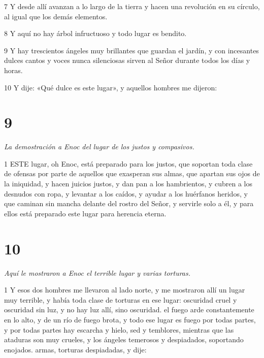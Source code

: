 \par 7 Y desde allí avanzan a lo largo de la tierra y hacen una revolución en su círculo, al igual que los demás elementos.

\par 8 Y aquí no hay árbol infructuoso y todo lugar es bendito.

\par 9 Y hay trescientos ángeles muy brillantes que guardan el jardín, y con incesantes dulces cantos y voces nunca silenciosas sirven al Señor durante todos los días y horas.

\par 10 Y dije: «Qué dulce es este lugar», y aquellos hombres me dijeron:

\chapter{9}

\par \textit{La demostración a Enoc del lugar de los justos y compasivos.}

\par 1 ESTE lugar, oh Enoc, está preparado para los justos, que soportan toda clase de ofensas por parte de aquellos que exasperan sus almas, que apartan sus ojos de la iniquidad, y hacen juicios justos, y dan pan a los hambrientos, y cubren a los desnudos con ropa, y levantar a los caídos, y ayudar a los huérfanos heridos, y que caminan sin mancha delante del rostro del Señor, y servirle solo a él, y para ellos está preparado este lugar para herencia eterna.

\chapter{10}

\par \textit{Aquí le mostraron a Enoc el terrible lugar y varias torturas.}

\par 1 Y esos dos hombres me llevaron al lado norte, y me mostraron allí un lugar muy terrible, y había toda clase de torturas en ese lugar: oscuridad cruel y oscuridad sin luz, y no hay luz allí, sino oscuridad. el fuego arde constantemente en lo alto, y de un río de fuego brota, y todo ese lugar es fuego por todas partes, y por todas partes hay escarcha y hielo, sed y temblores, mientras que las ataduras son muy crueles, y los ángeles temerosos y despiadados, soportando enojados. armas, torturas despiadadas, y dije:

